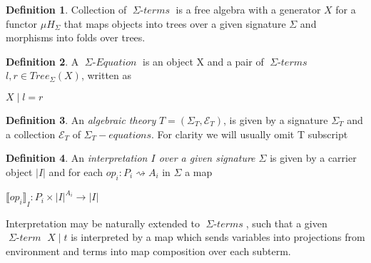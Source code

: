 \documentclass[declaration,shortabstract]{iithesis}
\theoremstyle{definition} \newtheorem{definition}{Definition}[chapter]
\theoremstyle{remark} \newtheorem{remark}[definition]{Observation}
\theoremstyle{plain} \newtheorem{theorem}[definition]{Theorem}
\theoremstyle{plain} \newtheorem{lemma}[definition]{Lemma}
\newcommand{\mathVar}[1]{{\operatorname{\mathit{#1}}}}
\begin{document}
    \begin{definition}

    Collection of $\mathVar{\Sigma-terms}$ is a free algebra with a generator $X$
    for a functor $ \mu H_{\Sigma} $ that maps objects into trees over a given
    signature $ \Sigma $ and morphisms into folds over trees.

    \end{definition}

    \begin{definition}

        A $ \mathVar{\Sigma-Equation} $ is an object X and a pair of
        $\mathVar{\Sigma-terms}$ $l, r \in Tree_{\Sigma}(X)$, written as

        \begin{center}
        $ X \mid l = r $
        \end{center}

    \end{definition}

    \begin{definition}

    An \textit{algebraic theory} $T = (\Sigma_{T}, \mathcal{E}_{T})$, is given by
    a signature $\Sigma_{T}$ and a collection $\mathcal{E}_{T}$ of
    $\mathVar{\Sigma_{T}-equations}$. For clarity we will usually omit T subscript

    \end{definition}

    \begin{definition}

    An \textit{interpretation $I$ over a given signature $\Sigma$} is given by
    a carrier object $|I|$ and for each $ op_{i} : P_{i} \rightsquigarrow A_{i} $
    in $\Sigma$ a map

    \begin{center}
        $ {\llbracket op_{i} \rrbracket}_I : P_{i} \times{} {|I|}^{A_{i}} \rightarrow |I| $
    \end{center}
    Interpretation may be naturally extended to $\mathVar{\Sigma-terms}$, such
    that a given $\mathVar{\Sigma-term}$ $X \mid t$ is interpreted by a map
    which sends variables into projections from environment and terms into
    map composition over each subterm.

    \end{definition}
\end{document}
